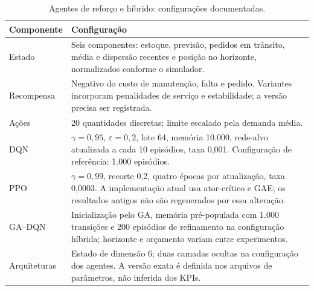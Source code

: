 \begin{table}[htbp]\centering\small
\caption{Agentes de reforço e híbrido: configurações documentadas.}\label{tab:rl_params}
\begin{tabular}{@{}p{3cm}p{11.4cm}@{}}\toprule
\textbf{Componente} & \textbf{Configuração}\\\midrule
Estado & Seis componentes: estoque, previsão, pedidos em trânsito, média e dispersão recentes e posição no horizonte, normalizados conforme o simulador.\\
Recompensa & Negativo do custo de manutenção, falta e pedido. Variantes incorporam penalidades de serviço e estabilidade; a versão precisa ser registrada.\\
Ações & 20 quantidades discretas; limite escalado pela demanda média.\\
DQN & $\gamma=0{,}95$, $\varepsilon=0,2$, lote 64, memória 10.000, rede-alvo atualizada a cada 10 episódios, taxa 0,001. Configuração de referência: 1.000 episódios.\\
PPO & $\gamma=0{,}99$, recorte 0,2, quatro épocas por atualização, taxa 0,0003. A implementação atual usa ator-crítico e GAE; os resultados antigos não são regenerados por essa alteração.\\
GA--DQN & Inicialização pelo GA, memória pré-populada com 1.000 transições e 200 episódios de refinamento na configuração híbrida; horizonte e orçamento variam entre experimentos.\\
Arquiteturas & Estado de dimensão 6; duas camadas ocultas na configuração dos agentes. A versão exata é definida nos arquivos de parâmetros, não inferida dos KPIs.\\
\bottomrule\end{tabular}\end{table}

